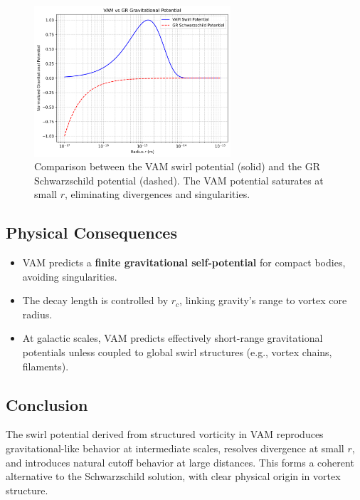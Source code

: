 \begin{figure}[H]
    \centering
    \includegraphics[width=0.65\textwidth]{images/vam_vs_gr_potential_plot.png}
    \caption{Comparison between the VAM swirl potential (solid) and the GR Schwarzschild potential (dashed). The VAM potential saturates at small \( r \), eliminating divergences and singularities.}
\end{figure}

\subsection{Physical Consequences}

\begin{itemize}
    \item VAM predicts a \textbf{finite gravitational self-potential} for compact bodies, avoiding singularities.
    \item The decay length is controlled by \( r_c \), linking gravity's range to vortex core radius.
    \item At galactic scales, VAM predicts effectively short-range gravitational potentials unless coupled to global swirl structures (e.g., vortex chains, filaments).
\end{itemize}

\subsection{Conclusion}

The swirl potential derived from structured vorticity in VAM reproduces gravitational-like behavior at intermediate scales, resolves divergence at small \( r \), and introduces natural cutoff behavior at large distances. This forms a coherent alternative to the Schwarzschild solution, with clear physical origin in vortex structure.
